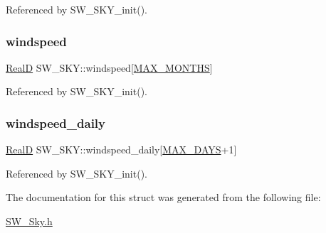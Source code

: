 Referenced by S\+W\+\_\+\+S\+K\+Y\+\_\+init().

\mbox{\label{struct_s_w___s_k_y_aca3ab26df7089417506c37978cb7f418}} 
\subsubsection{\texorpdfstring{windspeed}{windspeed}}
{\footnotesize\ttfamily \hyperlink{generic_8h_af1c105fd5732f70b91ddaeda0cc340e3}{RealD} S\+W\+\_\+\+S\+K\+Y\+::windspeed\mbox{[}\hyperlink{_times_8h_a9c97e6841188b672e984a4eba7479277}{M\+A\+X\+\_\+\+M\+O\+N\+T\+HS}\mbox{]}}



Referenced by S\+W\+\_\+\+S\+K\+Y\+\_\+init().

\mbox{\label{struct_s_w___s_k_y_a4ff5ab990d3ea971d383440c6548541f}} 
\subsubsection{\texorpdfstring{windspeed\+\_\+daily}{windspeed\_daily}}
{\footnotesize\ttfamily \hyperlink{generic_8h_af1c105fd5732f70b91ddaeda0cc340e3}{RealD} S\+W\+\_\+\+S\+K\+Y\+::windspeed\+\_\+daily\mbox{[}\hyperlink{_times_8h_a01f08d46080872b9f4284873b7f9dee4}{M\+A\+X\+\_\+\+D\+A\+YS}+1\mbox{]}}



Referenced by S\+W\+\_\+\+S\+K\+Y\+\_\+init().



The documentation for this struct was generated from the following file\+:\begin{DoxyCompactItemize}
\item 
\hyperlink{_s_w___sky_8h}{S\+W\+\_\+\+Sky.\+h}\end{DoxyCompactItemize}
